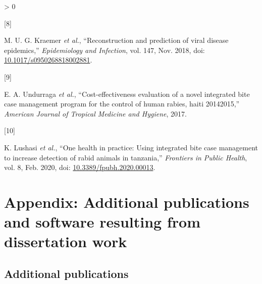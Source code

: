 \documentclass[
  oneside]{book}
\newlength{\cslhangindent}
\newlength{\csllabelwidth}
\newenvironment{CSLReferences}[2] %
 {%
  \setlength{\parindent}{0pt}
  \ifodd #1 \everypar{\setlength{\hangindent}{\cslhangindent}}\ignorespaces\fi
  \ifnum #2 > 0
  \setlength{\parskip}{#2\baselineskip}
  \fi
 }%
 {}
\newcommand{\CSLLeftMargin}[1]{\parbox[t]{\csllabelwidth}{#1}}
\newcommand{\CSLRightInline}[1]{\parbox[t]{\linewidth - \csllabelwidth}{#1}\break}
\begin{document}
\begin{CSLReferences}{0}{0}
\leavevmode\hypertarget{ref-kraemer2018}{}%
\CSLLeftMargin{{[}8{]} }
\CSLRightInline{M. U. G. Kraemer \emph{et al.}, {``Reconstruction and prediction of viral disease epidemics,''} \emph{Epidemiology and Infection}, vol. 147, Nov. 2018, doi: \href{https://doi.org/10.1017/s0950268818002881}{10.1017/s0950268818002881}.}

\leavevmode\hypertarget{ref-undurraga2017}{}%
\CSLLeftMargin{{[}9{]} }
\CSLRightInline{E. A. Undurraga \emph{et al.}, {``Cost-effectiveness evaluation of a novel integrated bite case management program for the control of human rabies, haiti 2014{{}}2015,''} \emph{American Journal of Tropical Medicine and Hygiene}, 2017.}

\leavevmode\hypertarget{ref-Lushasi2020}{}%
\CSLLeftMargin{{[}10{]} }
\CSLRightInline{K. Lushasi \emph{et al.}, {``One health in practice: Using integrated bite case management to increase detection of rabid animals in tanzania,''} \emph{Frontiers in Public Health}, vol. 8, Feb. 2020, doi: \href{https://doi.org/10.3389/fpubh.2020.00013}{10.3389/fpubh.2020.00013}.}

\end{CSLReferences}

\hypertarget{appendix-additional-publications-and-software-resulting-from-dissertation-work}{%
\chapter*{Appendix: Additional publications and software resulting from dissertation work}\label{appendix-additional-publications-and-software-resulting-from-dissertation-work}}

\hypertarget{additional-publications}{%
\section*{Additional publications}\label{additional-publications}}

\setlength{\parskip}{2em}
\end{document}
